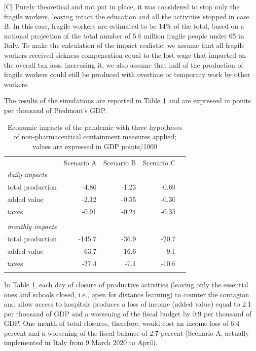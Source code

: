 \documentclass[graybox]{svmult}
\begin{document}
[C] Purely theoretical and not put in place, it was considered to stop only the fragile workers, leaving intact the education and all the activities stopped in case B. In this case, fragile workers are estimated to be 14\% of the total, based on a national projection of the total number of 5.6 million fragile people under 65 in Italy. To make the calculation of the impact realistic, we assume that all fragile workers received sickness compensation equal to the lost wage that impacted on the overall tax loss, increasing it; we also assume that half of the production of fragile workers could still be produced with overtime or temporary work by other workers.

The results of the simulations are reported in Table \ref{ABC} and are expressed in points per thousand of Piedmont's GDP.

\begin{table}[t]
\centering
\begin{tabular}{lrrrr}
\hline\noalign{\smallskip}
& Scenario A & Scenario B & Scenario C \\
\noalign{\smallskip}\svhline\noalign{\smallskip}
\emph{daily impacts} \\
total production & -4.86 & -1.23 & -0.69  \\
added value & -2.12 & -0.55 & -0.30 \\
taxes & -0.91 & -0.24 & -0.35 \\
\\
\emph{monthly impacts} \\
total production &-145.7 & -36.9 & -20.7  \\
added value & -63.7 & -16.6 & -9.1 \\
taxes & -27.4 & -7.1 & -10.6 \\
\hline\noalign{\smallskip}  
\end{tabular}
\caption{Economic impacts of the pandemic with three hypotheses of non-pharmaceutical containment measures applied; values are expressed in GDP points/1000}
\label{ABC}
\end{table}

In Table \ref{ABC}, each day of closure of productive activities (leaving only the essential ones and schools closed, i.e., open for distance learning) to counter the contagion and allow access to hospitals produces a loss of income (added value) equal to 2.1 per thousand of GDP and a worsening of the fiscal budget by 0.9 per thousand of GDP. One month of total closures, therefore, would cost an income loss of 6.4 percent and a worsening of the fiscal balance of 2.7 percent (Scenario A, actually implemented in Italy from 9 March 2020 to April).
\end{document}
